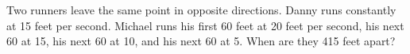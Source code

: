 Two runners leave the same point in opposite directions. Danny runs constantly at 15 feet per second. Michael runs his first 60 feet at 20 feet per second, his next 60 at 15, his next 60 at 10, and his next 60 at 5. When are they 415 feet apart?
